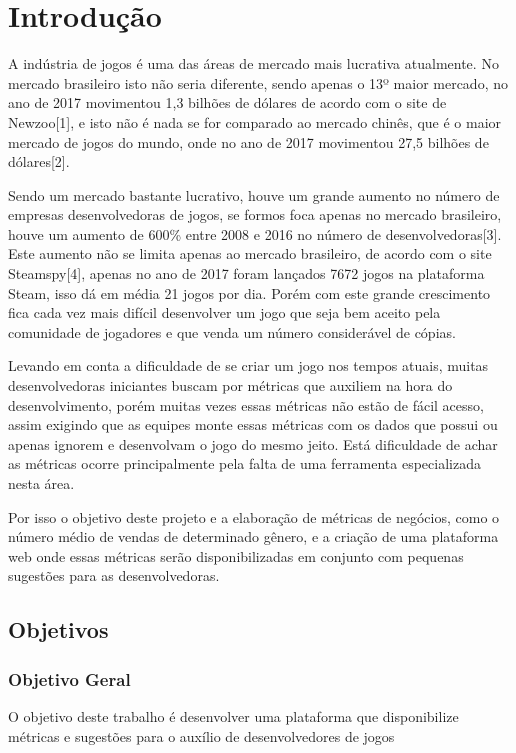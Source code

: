 \chapter*[Introdução]{Introdução}
A indústria de jogos é uma das áreas de mercado mais lucrativa atualmente. No mercado brasileiro isto não seria diferente, sendo apenas o 13º maior mercado, no ano de 2017 movimentou 1,3 bilhões de dólares de acordo com o site de Newzoo[1], e isto não é nada se for comparado ao mercado chinês, que é o maior mercado de jogos do mundo, onde no ano de 2017 movimentou 27,5 bilhões de dólares[2].

Sendo um mercado bastante lucrativo, houve um grande aumento no número de empresas desenvolvedoras de jogos, se formos foca apenas no mercado brasileiro, houve um aumento de 600\% entre 2008 e 2016 no número de desenvolvedoras[3]. Este aumento não se limita apenas ao mercado brasileiro, de acordo com o site Steamspy[4], apenas no ano de 2017 foram lançados 7672 jogos na plataforma Steam, isso dá em média 21 jogos por dia. Porém com este grande crescimento fica cada vez mais difícil desenvolver um jogo que seja bem aceito pela comunidade de jogadores e que venda um número considerável de cópias.

Levando em conta a dificuldade de se criar um jogo nos tempos atuais, muitas desenvolvedoras iniciantes buscam por métricas que auxiliem na hora do desenvolvimento, porém muitas vezes essas métricas não estão de fácil acesso, assim exigindo que as equipes monte essas métricas com os dados que possui ou apenas ignorem e desenvolvam o jogo do mesmo jeito. Está dificuldade de achar as métricas ocorre principalmente pela falta de uma ferramenta especializada nesta área.

Por isso o objetivo deste projeto e a elaboração de métricas de negócios, como o número médio de vendas de determinado gênero, e a criação de uma plataforma web onde essas métricas serão disponibilizadas em conjunto com pequenas sugestões para as desenvolvedoras.

\section*{Objetivos}
	\subsection*{Objetivo Geral}
	O objetivo deste trabalho é desenvolver uma plataforma que disponibilize métricas e sugestões para o auxílio de desenvolvedores de jogos
